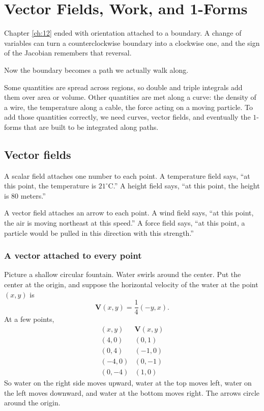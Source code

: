 
\chapter{Vector Fields, Work, and 1-Forms}
\label{ch:13}

Chapter \ref{ch:12} ended with orientation attached to a boundary.  A change of
variables can turn a counterclockwise boundary into a clockwise one, and the sign of
the Jacobian remembers that reversal.

Now the boundary becomes a path we actually walk along.

Some quantities are spread across regions, so double and triple integrals add them over
area or volume.  Other quantities are met along a curve: the density of a wire, the
temperature along a cable, the force acting on a moving particle.  To add those
quantities correctly, we need curves, vector fields, and eventually the \(1\)-forms that
are built to be integrated along paths.

\section{Vector fields}
\label{sec:13.1}

A scalar field attaches one number to each point.  A temperature field says,
``at this point, the temperature is \(21^\circ\text{C}\).''  A height field says,
``at this point, the height is \(80\) meters.''

A vector field attaches an arrow to each point.  A wind field says, ``at this point, the
air is moving northeast at this speed.''  A force field says, ``at this point, a particle
would be pulled in this direction with this strength.''

\subsection{A vector attached to every point}

Picture a shallow circular fountain.  Water swirls around the center.  Put the center at
the origin, and suppose the horizontal velocity of the water at the point \((x,y)\) is
\[
    \mathbf V(x,y)=\frac14(-y,x).
\]
At a few points,
\[
\begin{array}{c|c}
(x,y) & \mathbf V(x,y) \\ \hline
(4,0) & (0,1)\\
(0,4) & (-1,0)\\
(-4,0) & (0,-1)\\
(0,-4) & (1,0)
\end{array}
\]
So water on the right side moves upward, water at the top moves left, water on the
left moves downward, and water at the bottom moves right.  The arrows circle around
the origin.

